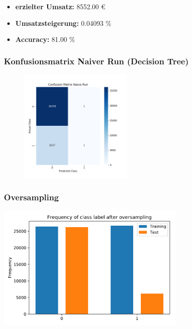 \documentclass{beamer}
\begin{document}
\begin{frame}
\begin{footnotesize}
\begin{itemize}
\item  \textbf{erzielter Umsatz:} 8552.00 \euro{}
\item \textbf{Umsatzsteigerung:}	0.04093 \% 
\item \textbf{Accuracy:} 81.00 \%
\end{itemize}
\end{footnotesize}

\frametitle{Konfusionsmatrix Naiver Run (Decision Tree)}
\begin{figure}[ht]
	\centering
  \includegraphics[width=0.5\textwidth]{img/naiveRun.png} 	
	\label{fig1}
\end{figure}
\end{frame}

\begin{frame}
\frametitle{Oversampling}
\begin{center}
\includegraphics[width=0.7\textwidth]{pdf/oversampled.pdf}
\end{center}
\end{frame}
\end{document}
